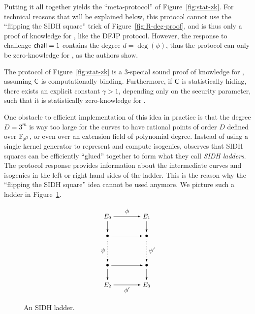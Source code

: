 Putting it all together yields the ``meta-protocol'' of
Figure~\ref{fig:stat-zk}. For technical reasons that will be explained below, this protocol cannot use the ``flipping the SIDH square''
trick of Figure~\ref{fig:R-deg-proof}, and is thus only a proof of
knowledge for \R[isog], like the DFJP protocol.  However, the response
to challenge $\mathsf{chall}=1$ contains the degree $d=\deg(\phi)$, thus the
protocol can only be zero-knowledge for \R[deg], as the authors show.

\begin{proposition}
  The protocol of Figure~\ref{fig:stat-zk} is a 3-special sound proof
  of knowledge for \R[isog], assuming $\mathsf{C}$ is computationally
  binding.  Furthermore, if $\mathsf{C}$ is statistically hiding, there
  exists an explicit constant $\gamma>1$, depending only on the
  security parameter, such that it is statistically zero-knowledge for
  \R[deg].
\end{proposition}

One obstacle to efficient implementation of this idea in practice is that the
degree $D=3^m$ is way too large for the curves to have rational points
of order $D$ defined over $\mathbb{F}_{p^2}$, or even over an extension field
of polynomial degree.  Instead of using a single kernel generator to
represent and compute isogenies, \cite{cryptoeprint:2022/1469} observes that SIDH squares
can be efficiently ``glued'' together to form what they call
\emph{SIDH ladders}.
The protocol response provides information about the intermediate curves and isogenies in the left or right hand sides of the ladder.
This is the reason why the ``flipping the SIDH square'' idea cannot be used anymore.
We picture such a ladder in Figure~\ref{fig:ladder}.

\begin{figure}
%
\begin{equation*}
  \begin{tikzpicture}
    \small
    \node (E0) at (0,0) {$E_0$};
    \node (E1) at (2,0) {$E_1$};
    \node (Ee0) at (0,-1) {$\bullet$};
    \node (Eo0) at (2,-1) {$\bullet$};
    \node (Ee1) at (0,-2.5) {$\bullet$};
    \node (Eo1) at (2,-2.5) {$\bullet$};
    \node (E2) at (0,-3.5) {$E_2$};
    \node (E3) at (2,-3.5) {$E_3$};

    \draw[-latex]
    (E0) edge node[above] {$\phi$} (E1)
    (Ee0) edge (Eo0)
    (Ee1) edge (Eo1)
    (E2) edge node[below] {$\phi'$} (E3)
    (E0) edge (Ee0)
    (E1) edge (Eo0)
    (Ee1) edge (E2)
    (Eo1) edge (E3);
    \draw[dotted,-latex]
    (Ee0) edge node[left] {$\psi$} (Ee1)
    (Eo0) edge node[right] {$\psi'$} (Eo1);
  \end{tikzpicture}
\end{equation*}
\caption{An SIDH ladder.} \label{fig:ladder}
\end{figure}

